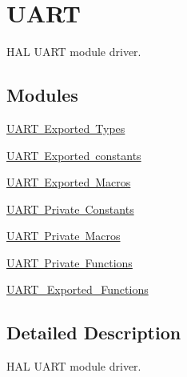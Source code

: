 \hypertarget{group___u_a_r_t}{}\section{U\+A\+RT}
\label{group___u_a_r_t}


H\+AL U\+A\+RT module driver.  


\subsection*{Modules}
\begin{DoxyCompactItemize}
\item 
\mbox{\hyperlink{group___u_a_r_t___exported___types}{U\+A\+R\+T Exported Types}}
\item 
\mbox{\hyperlink{group___u_a_r_t___exported___constants}{U\+A\+R\+T Exported constants}}
\item 
\mbox{\hyperlink{group___u_a_r_t___exported___macros}{U\+A\+R\+T Exported Macros}}
\item 
\mbox{\hyperlink{group___u_a_r_t___private___constants}{U\+A\+R\+T Private Constants}}
\item 
\mbox{\hyperlink{group___u_a_r_t___private___macros}{U\+A\+R\+T Private Macros}}
\item 
\mbox{\hyperlink{group___u_a_r_t___private___functions}{U\+A\+R\+T Private Functions}}
\item 
\mbox{\hyperlink{group___u_a_r_t___exported___functions}{U\+A\+R\+T\+\_\+\+Exported\+\_\+\+Functions}}
\end{DoxyCompactItemize}


\subsection{Detailed Description}
H\+AL U\+A\+RT module driver. 

